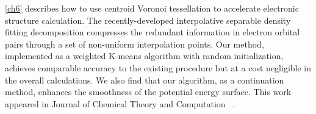 \cref{ch6} describes how to use centroid Voronoi tessellation to accelerate
electronic structure calculation. The recently\hyp{}developed interpolative
separable density fitting decomposition compresses the redundant information in
electron orbital pairs through a set of non\hyp{}uniform interpolation points.
Our method, implemented as a weighted K-means algorithm with random
initialization, achieves comparable accuracy to the existing procedure but at a
cost negligible in the overall calculations. We also find that our algorithm, as
a continuation method, enhances the smoothness of the potential energy surface.
This work appeared in Journal of Chemical Theory and Computation~
\cite{dong2018interpolative}.